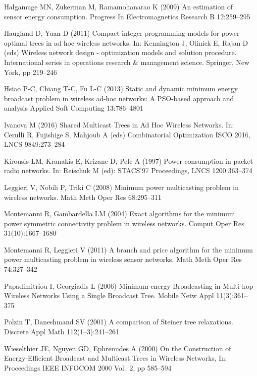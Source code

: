 \documentclass[natbib,smallextended]{svjour3}       %
\begin{document}
\begin{thebibliography}{}
Halgamuge MN, Zukerman M, Ramamohanarao K (2009)
An estimation of sensor energy consumption.
Progress In Electromagnetics Research B 12:259--295

Haugland D, Yuan D (2011)
Compact integer programming models for power-optimal trees in ad hoc wireless networks.
In: Kennington J, Olinick E, Rajan D (eds) Wireless network design - optimization models and solution procedure.
International series in operations research \& management science.
Springer, New York, pp 219--246

Hsiao P-C, Chiang T-C, Fu L-C (2013)
Static and dynamic minimum energy broadcast problem in wireless ad-hoc networks: A PSO-based approach and analysis
Applied Soft Computing
13:786--4801

Ivanova M (2016)
Shared Multicast Trees in Ad Hoc Wireless Networks.
In: Cerulli R, Fujishige S, Mahjoub A (eds) Combinatorial Optimization ISCO 2016,
LNCS 9849:273--284

Kirousis LM, Kranakis E, Krizanc D, Pelc A (1997)
Power consumption in packet radio networks.
In: Reischuk M (ed): STACS'97 Proceedings,
LNCS 1200:363--374

Leggieri V, Nobili P, Triki C (2008)
Minimum power multicasting problem in wireless networks.
Math Meth Oper Res 68:295–311

Montemanni R, Gambardella LM (2004)
Exact algorithms for the minimum power symmetric connectivity problem in wireless networks.
Comput Oper Res 31(10):1667--1680

Montemanni R, Leggieri V (2011)
A branch and price algorithm for the minimum power multicasting problem in wireless sensor networks.
Math Meth Oper Res
74:327--342

Papadimitriou I, Georgiadis L (2006)
Minimum-energy Broadcasting in Multi-hop Wireless Networks Using a Single Broadcast Tree.
Mobile Netw Appl
11(3):361--375

Polzin T, Daneshmand SV (2001)
A comparison of Steiner tree relaxations.
Discrete Appl Math
112(1--3):241--261

Wieselthier JE, Nguyen GD, Ephremides A (2000)
On the Construction of Energy-Efficient Broadcast and Multicast Trees in Wireless Networks,
In: Proceedings IEEE INFOCOM 2000 Vol.\ 2, pp 585--594


\end{thebibliography}
\end{document}
